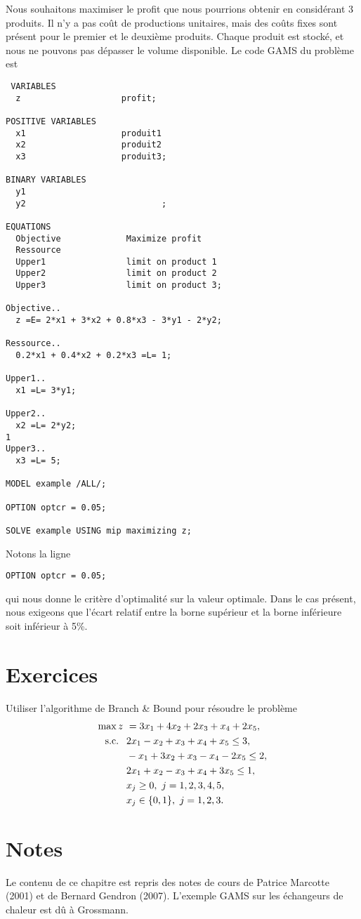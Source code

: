 \begin{example}
Nous souhaitons maximiser le profit que nous pourrions obtenir en considérant 3 produits.
Il n'y a pas coût de productions unitaires, mais des coûts fixes sont présent pour le premier et le deuxième produits.
Chaque produit est stocké, et nous ne pouvons pas dépasser le volume disponible.
Le code GAMS du problème est
\begin{verbatim}
 VARIABLES
  z                    profit;

POSITIVE VARIABLES
  x1                   produit1
  x2                   produit2
  x3                   produit3;

BINARY VARIABLES
  y1
  y2                           ;

EQUATIONS
  Objective             Maximize profit
  Ressource
  Upper1                limit on product 1
  Upper2                limit on product 2
  Upper3                limit on product 3;

Objective..
  z =E= 2*x1 + 3*x2 + 0.8*x3 - 3*y1 - 2*y2;

Ressource..
  0.2*x1 + 0.4*x2 + 0.2*x3 =L= 1;

Upper1..
  x1 =L= 3*y1;

Upper2..
  x2 =L= 2*y2;
1
Upper3..
  x3 =L= 5;

MODEL example /ALL/;

OPTION optcr = 0.05;

SOLVE example USING mip maximizing z;
\end{verbatim}
Notons la ligne
 \begin{verbatim}
OPTION optcr = 0.05;
\end{verbatim}
qui nous donne le critère d'optimalité sur la valeur optimale.
Dans le cas présent, nous exigeons que l'écart relatif entre la borne supérieur et la borne inférieure soit inférieur à 5\%.
\end{example}

\section{Exercices}

\begin{exercise}
Utiliser l'algorithme de Branch \& Bound pour résoudre le problème
\begin{align*}
\max z\ &= 3x_1 + 4x_2 + 2x_3 + x_4 +2x_5,\\
\mbox{s.c. }{}\ & 2x_1 - x_2 + x_3 + x_4 +x_5 \leq 3, \\
& -x_1+3x_2 + x_3 - x_4 - 2x_5 \leq 2, \\
& 2x_1 + x_2 - x_3 + x_4 +3x_5 \leq 1,\\
& x_j \geq 0,\ j = 1,2,3,4,5,\\
& x_j \in \lbrace 0, 1\rbrace,\ j = 1, 2, 3.
\end{align*}
\end{exercise}

\section{Notes}

Le contenu de ce chapitre est repris des notes de cours de Patrice Marcotte (2001) et de Bernard Gendron (2007).
L'exemple GAMS sur les échangeurs de chaleur est dû à Grossmann.